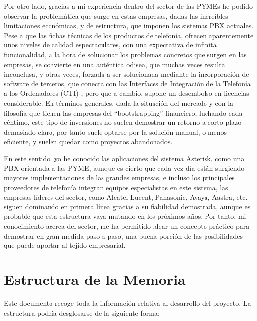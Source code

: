 Por otro lado, gracias a mi experiencia dentro del sector de las PYMEs he podido observar la problemática que surge en estas empresas, dadas las increíbles limitaciones económicas, y de estructura, que imponen los sistemas PBX actuales. Pese a que las fichas técnicas de los productos de telefonía, ofrecen aparentemente unos niveles de calidad espectaculares, con una expectativa de infinita funcionalidad, a la hora de solucionar los problemas concretos que surgen en las empresas, se convierte en una auténtica odisea, que muchas veces resulta inconclusa, y otras veces, forzada a ser solucionada mediante la incorporación de software de terceros, que conecta con las Interfaces de Integración de la Telefonía a los Ordenadores (CTI) \cite{website:cti}, pero que a cambio, supone un desembolso en licencias considerable. En términos generales, dada la situación del mercado y con la filosofía que tienen las empresas del ``bootstrapping'' financiero, luchando cada céntimo, este tipo de inversiones no suelen demostrar un retorno a corto plazo demasiado claro, por tanto suele optarse por la solución manual, o menos eficiente, y suelen quedar como proyectos abandonados.

En este sentido, yo he conocido las aplicaciones del sistema Asterisk, como una PBX orientada a las PYME, aunque es cierto que cada vez día están surgiendo mayores implementaciones de las grandes empresas, e incluso los principales proveedores de telefonía integran equipos especialistas en este sistema, las empresas líderes del sector, como Alcatel-Lucent, Panasonic, Avaya, Aastra, etc. siguen dominando en primera línea gracias a su fiabilidad demostrada, aunque es probable que esta estructura vaya mutando en los próximos años. Por tanto, mi conocimiento acerca del sector, me ha permitido idear un concepto práctico para demostrar en gran medida paso a paso, una buena porción de las posibilidades que puede aportar al tejido empresarial.

\section{Estructura de la Memoria}

Este documento recoge toda la información relativa al desarrollo del proyecto. La estructura podría desglosarse de la siguiente forma:


